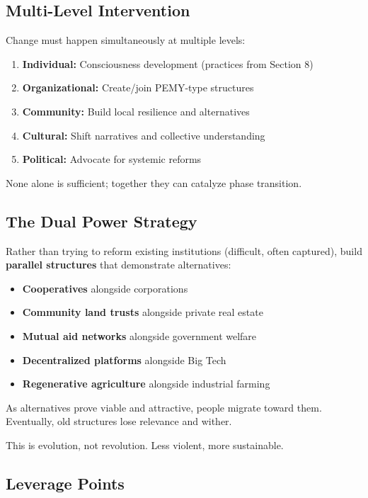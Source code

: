 \documentclass[11pt,a4paper]{article}
\theoremstyle{definition}
\theoremstyle{remark}
\begin{document}
\subsection{Multi-Level Intervention}

Change must happen simultaneously at multiple levels:

\begin{enumerate}
    \item \textbf{Individual:} Consciousness development (practices from Section 8)
    \item \textbf{Organizational:} Create/join PEMY-type structures
    \item \textbf{Community:} Build local resilience and alternatives
    \item \textbf{Cultural:} Shift narratives and collective understanding
    \item \textbf{Political:} Advocate for systemic reforms
\end{enumerate}

None alone is sufficient; together they can catalyze phase transition.

\subsection{The Dual Power Strategy}

Rather than trying to reform existing institutions (difficult, often captured), build \textbf{parallel structures} that demonstrate alternatives:

\begin{itemize}
    \item \textbf{Cooperatives} alongside corporations
    \item \textbf{Community land trusts} alongside private real estate
    \item \textbf{Mutual aid networks} alongside government welfare
    \item \textbf{Decentralized platforms} alongside Big Tech
    \item \textbf{Regenerative agriculture} alongside industrial farming
\end{itemize}

As alternatives prove viable and attractive, people migrate toward them. Eventually, old structures lose relevance and wither.

This is evolution, not revolution. Less violent, more sustainable.

\subsection{Leverage Points}
\end{document}
